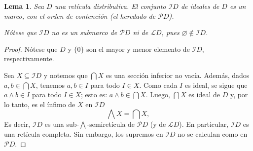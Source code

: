 \documentclass[12pt,letterpaper,titlepage]{article}
\let\emptyset\varnothing
\newtheorem{lemma}{Lema}
\theoremstyle{definition}
\renewcommand\inf{\wedge}
\newcommand\Inf{\bigwedge}
\renewcommand\cal[1]{\mathcal{#1}}
\newcommand\<{\langle}
\renewcommand\>{\rangle}
\begin{document}
\begin{lemma}
    Sea $D$ una retícula distributiva.
    El conjunto $\cal ID$ de ideales de $D$ es un marco,
    con el orden de contención (el heredado de $\cal PD$).
    
    Nótese que $\cal ID$ no es un submarco de $\cal PD$
    ni de $\cal LD$, pues $\emptyset\nin\cal ID$.
\end{lemma}
\begin{proof}
    Nótese que $D$ y $\{0\}$ son el mayor y menor elemento
    de $\cal ID$, respectivamente.
    
    Sea $X\subseteq\cal ID$ y notemos que $\bigcap X$
    es una sección inferior no vacía.
    Además, dados $a,b\in \bigcap X$, tenemos
    $a,b\in I$ para todo $I\in X$.
    Como cada $I$ es ideal, se sigue que
    $a\inf b\in I$ para todo $I\in X$; esto es:
    $a\inf b\in\bigcap X$.
    Luego, $\bigcap X$ es ideal de $D$ y, por lo tanto,
    es el ínfimo de $X$ en $\cal ID$
    \[
        \Inf X = \bigcap X,
    \]
    Es decir, $\cal ID$ es una sub-$\Inf$-semiretícula
    de $\cal PD$ (y de $\cal LD$).
    En particular, $\cal ID$ es una retícula completa.
    Sin embargo, los supremos en $\cal ID$ no se calculan
    como en $\cal PD$.
    

\end{proof}
\end{document}
